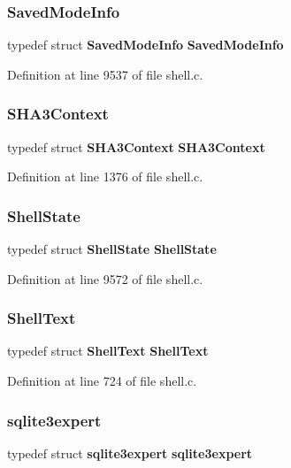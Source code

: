 \subsubsection{Saved\+Mode\+Info}
{\footnotesize\ttfamily typedef struct \textbf{ Saved\+Mode\+Info} \textbf{ Saved\+Mode\+Info}}



Definition at line 9537 of file shell.\+c.

\mbox{\label{shell_8c_aabb5acf00722637e06bb6b52e211145b}} 
\subsubsection{S\+H\+A3\+Context}
{\footnotesize\ttfamily typedef struct \textbf{ S\+H\+A3\+Context} \textbf{ S\+H\+A3\+Context}}



Definition at line 1376 of file shell.\+c.

\mbox{\label{shell_8c_aa632438ddb8610bac7dcaf0e17b1f14b}} 
\subsubsection{Shell\+State}
{\footnotesize\ttfamily typedef struct \textbf{ Shell\+State} \textbf{ Shell\+State}}



Definition at line 9572 of file shell.\+c.

\mbox{\label{shell_8c_a6d9f54192cd3f08cdfa31ac4cab7e6cc}} 
\subsubsection{Shell\+Text}
{\footnotesize\ttfamily typedef struct \textbf{ Shell\+Text} \textbf{ Shell\+Text}}



Definition at line 724 of file shell.\+c.

\mbox{\label{shell_8c_a378e805e6bf318509c071201e717181e}} 
\subsubsection{sqlite3expert}
{\footnotesize\ttfamily typedef struct \textbf{ sqlite3expert} \textbf{ sqlite3expert}}



